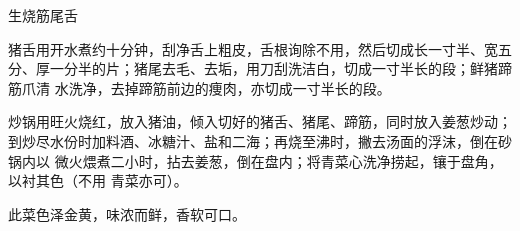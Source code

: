 %
%
%
%
%
%
%
\begin{recipe}{生烧筋尾舌}

\ingredients


\preparation

\step 猪舌用开水煮约十分钟，刮净舌上粗皮，舌根询除不用，然后切成长一寸半、宽五
分、厚一分半的片；猪尾去毛、去垢，用刀刮洗洁白，切成一寸半长的段；鲜猪蹄筋爪清
水洗净，去掉蹄筋前边的痩肉，亦切成一寸半长的段。

\step 炒锅用旺火烧红，放入猪油，倾入切好的猪舌、猪尾、蹄筋，同时放入姜葱炒动；
到炒尽水份时加料酒、冰糖汁、盐和二海；再烧至沸时，撇去汤面的浮沫，倒在砂锅内以
微火煨煮二小时，拈去姜葱，倒在盘内；将青菜心洗净捞起，镶于盘角，以衬其色（不用
青菜亦可）。

\features

此菜色泽金黄，味浓而鲜，香软可口。

\end{recipe}

